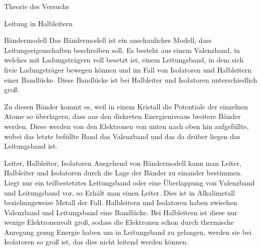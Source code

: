 \documentclass[pdftex, a4paper,11pt, twoside, ngerman]{report}
\begin{document}
  
  
  
  
  
  
  
  
  
  \tableofcontents
  
  
  
  \begin{chapter}{Theorie des Versuchs}
    \label{chp:Theorie}
   
   
    \begin{section}{Leitung in Halbleitern}
        \begin{subsection}{Bändermodell}
            Das Bändermodell ist ein anschauliches Modell, dass Leitungseigenschaften beschreiben soll. 
            Es besteht aus einem Valenzband, in welches mit Ladungsträgern voll besetzt ist, einem Leitungsband, in dem sich freie Ladungsträger bewegen können und im Fall von Isolatoren und Halbleitern einer Bandlücke.
            Diese Bandlücke ist bei Halbleiter und Isolatoren unterschiedlich groß.

            Zu diesen Bänder kommt es, weil in einem Kristall die Potentiale der einzelnen Atome so überlagern, dass aus den diskreten Energieniveaus breitere Bänder werden.
            Diese werden von den Elektronen von unten nach oben hin aufgefüllte, wobei das letzte befüllte Band das Valenzband und das da drüber liegen das Leitungsband ist.
            
        \end{subsection}

        \begin{subsection}{Leiter, Halbleiter, Isolatoren}
            Ausgehend von Bändermodell kann man Leiter, Halbleiter und Isolatoren durch die Lage der Bänder zu einander bestimmen.
            Liegt nur ein teilbestetztes Leitungsband oder eine Überlappung von Valenzband und Leitungsband vor, so Erhält man einen Leiter.
            Dies ist in Alkalimetall beziehungsweise Metall der Fall.
            Halbleitern und Isolatoren haben zwischen Valenzband und Leitungsband eine Bandlücke. 
            Bei Halbleitern ist diese nur wenige Elektronenvolt groß, sodass die Elektronen schon durch thermische Anregung genug Energie haben um in Leitungsband zu gelangen, werden sie bei Isolatoren so groß ist, das dies nicht leitend werden können.
            

\end{subsection}
\end{section}
\end{chapter}
\end{document}
